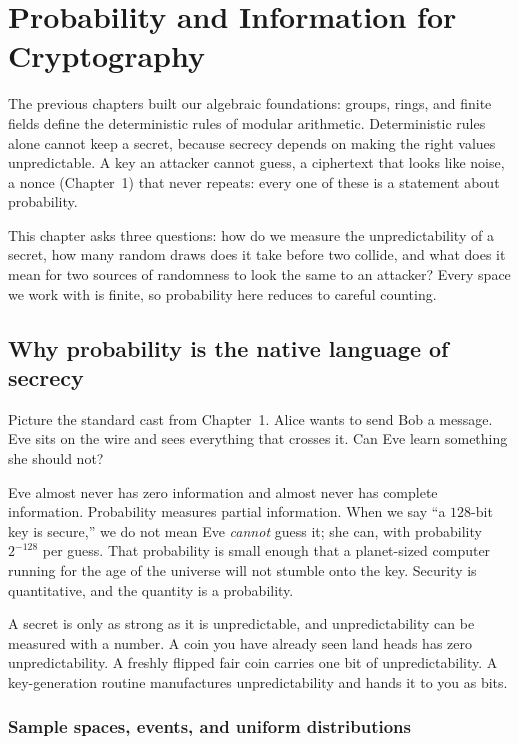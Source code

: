 \chapter{Probability and Information for Cryptography}

The previous chapters built our algebraic foundations: groups, rings, and finite fields define the deterministic rules of modular arithmetic. Deterministic rules alone cannot keep a secret, because secrecy depends on making the right values unpredictable. A key an attacker cannot guess, a ciphertext that looks like noise, a nonce (Chapter~1) that never repeats: every one of these is a statement about probability.

This chapter asks three questions: how do we measure the unpredictability of a secret, how many random draws does it take before two collide, and what does it mean for two sources of randomness to look the same to an attacker? Every space we work with is finite, so probability here reduces to careful counting.

\chapterline

\section{Why probability is the native language of secrecy}

Picture the standard cast from Chapter~1. Alice wants to send Bob a message. Eve sits on the wire and sees everything that crosses it. Can Eve learn something she should not?

Eve almost never has zero information and almost never has complete information. Probability measures partial information. When we say ``a $128$-bit key is secure,'' we do not mean Eve \emph{cannot} guess it; she can, with probability $2^{-128}$ per guess. That probability is small enough that a planet-sized computer running for the age of the universe will not stumble onto the key. Security is quantitative, and the quantity is a probability.

\begin{intuitionbox}
A secret is only as strong as it is unpredictable, and unpredictability can be measured with a number. A coin you have already seen land heads has zero unpredictability. A freshly flipped fair coin carries one bit of unpredictability. A key-generation routine manufactures unpredictability and hands it to you as bits.
\end{intuitionbox}

\subsection{Sample spaces, events, and uniform distributions}

